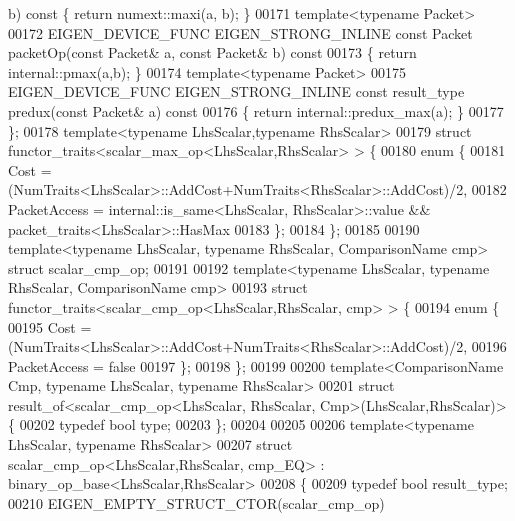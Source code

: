 \begin{DoxyCode}
      b)\textcolor{keyword}{ const }\{ \textcolor{keywordflow}{return} numext::maxi(a, b); \}
00171   \textcolor{keyword}{template}<\textcolor{keyword}{typename} Packet>
00172   EIGEN\_DEVICE\_FUNC EIGEN\_STRONG\_INLINE \textcolor{keyword}{const} Packet packetOp(\textcolor{keyword}{const} Packet& a, \textcolor{keyword}{const} Packet& b)\textcolor{keyword}{ const}
00173 \textcolor{keyword}{  }\{ \textcolor{keywordflow}{return} internal::pmax(a,b); \}
00174   \textcolor{keyword}{template}<\textcolor{keyword}{typename} Packet>
00175   EIGEN\_DEVICE\_FUNC EIGEN\_STRONG\_INLINE \textcolor{keyword}{const} result\_type predux(\textcolor{keyword}{const} Packet& a)\textcolor{keyword}{ const}
00176 \textcolor{keyword}{  }\{ \textcolor{keywordflow}{return} internal::predux\_max(a); \}
00177 \};
00178 \textcolor{keyword}{template}<\textcolor{keyword}{typename} LhsScalar,\textcolor{keyword}{typename} RhsScalar>
00179 \textcolor{keyword}{struct }functor\_traits<scalar\_max\_op<LhsScalar,RhsScalar> > \{
00180   \textcolor{keyword}{enum} \{
00181     Cost = (NumTraits<LhsScalar>::AddCost+NumTraits<RhsScalar>::AddCost)/2,
00182     PacketAccess = internal::is\_same<LhsScalar, RhsScalar>::value && packet\_traits<LhsScalar>::HasMax
00183   \};
00184 \};
00185 
00190 \textcolor{keyword}{template}<\textcolor{keyword}{typename} LhsScalar, \textcolor{keyword}{typename} RhsScalar, ComparisonName cmp> \textcolor{keyword}{struct }scalar\_cmp\_op;
00191 
00192 \textcolor{keyword}{template}<\textcolor{keyword}{typename} LhsScalar, \textcolor{keyword}{typename} RhsScalar, ComparisonName cmp>
00193 \textcolor{keyword}{struct }functor\_traits<scalar\_cmp\_op<LhsScalar,RhsScalar, cmp> > \{
00194   \textcolor{keyword}{enum} \{
00195     Cost = (NumTraits<LhsScalar>::AddCost+NumTraits<RhsScalar>::AddCost)/2,
00196     PacketAccess = \textcolor{keyword}{false}
00197   \};
00198 \};
00199 
00200 \textcolor{keyword}{template}<ComparisonName Cmp, \textcolor{keyword}{typename} LhsScalar, \textcolor{keyword}{typename} RhsScalar>
00201 \textcolor{keyword}{struct }result\_of<scalar\_cmp\_op<LhsScalar, RhsScalar, Cmp>(LhsScalar,RhsScalar)> \{
00202   \textcolor{keyword}{typedef} \textcolor{keywordtype}{bool} type;
00203 \};
00204 
00205 
00206 \textcolor{keyword}{template}<\textcolor{keyword}{typename} LhsScalar, \textcolor{keyword}{typename} RhsScalar>
00207 \textcolor{keyword}{struct }scalar\_cmp\_op<LhsScalar,RhsScalar, cmp\_EQ> : binary\_op\_base<LhsScalar,RhsScalar>
00208 \{
00209   \textcolor{keyword}{typedef} \textcolor{keywordtype}{bool} result\_type;
00210   EIGEN\_EMPTY\_STRUCT\_CTOR(scalar\_cmp\_op)

\end{DoxyCode}
